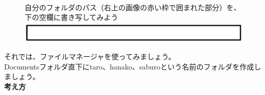 \documentclass[a4paper,12pt]{jarticle}
\begin{document}
\begin{figure}[ht]
\theQuestion\\
自分のフォルダのパス（右上の画像の赤い枠で囲まれた部分）を、下の空欄に書き写してみよう
\includegraphics[width=17cm]{textbook-img1021.png}

\vspace{20pt}
\end{figure}
\clearpage

それでは、ファイルマネージャを使ってみましょう。\\Documentsフォルダ直下にtaro、hanako、saburoという名前のフォルダを作成しましょう。\\

{\bf \large 考え方}
\vfill
\end{document}
